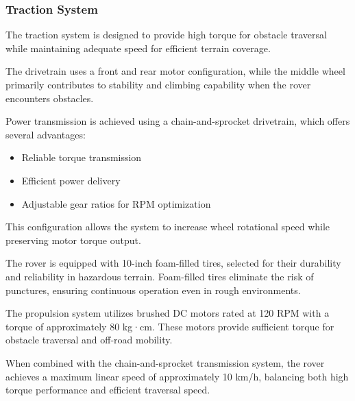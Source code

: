 \documentclass[11pt,a4paper]{article}
\begin{document}
\subsubsection{Traction System}

The traction system is designed to provide high torque for obstacle traversal while maintaining adequate speed for efficient terrain coverage.

The drivetrain uses a front and rear motor configuration, while the middle wheel primarily contributes to stability and climbing capability when the rover encounters obstacles.

Power transmission is achieved using a chain-and-sprocket drivetrain, which offers several advantages:


\vspace{-7pt}
\begin{itemize}[left=0pt, label=-]
\setlength{\itemsep}{0pt}
\setlength{\parskip}{0pt}
\setlength{\parsep}{0pt}
\item Reliable torque transmission
\item Efficient power delivery
\item Adjustable gear ratios for RPM optimization
\end{itemize}


This configuration allows the system to increase wheel rotational speed while preserving motor torque output.

The rover is equipped with 10-inch foam-filled tires, selected for their durability and reliability in hazardous terrain. Foam-filled tires eliminate the risk of punctures, ensuring continuous operation even in rough environments.

The propulsion system utilizes brushed DC motors rated at 120 RPM with a torque of approximately 80 kg·cm. These motors provide sufficient torque for obstacle traversal and off-road mobility.

When combined with the chain-and-sprocket transmission system, the rover achieves a maximum linear speed of approximately 10 km/h, balancing both high torque performance and efficient traversal speed.
\end{document}
